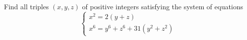 Find all triples $(x,y,z)$ of positive integers satisfying the system of equations\[\begin{cases} x^2=2(y+z)\\ x^6=y^6+z^6+31(y^2+z^2)\end{cases}\]